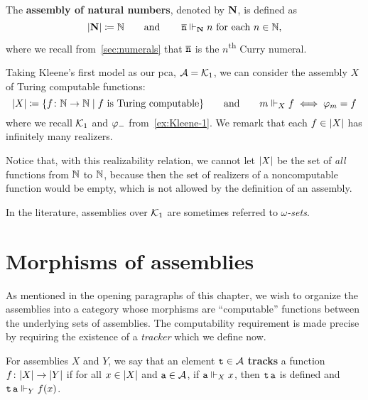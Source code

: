 \begin{example}\label{ex:NatAsm}
  The \textbf{assembly of natural numbers}, denoted by \(\mathbf N\), is defined as
  \[
    \lvert\mathbf N\rvert \coloneqq \mathbb N
    \quad\quad\text{and}\quad\quad
    \operatorname{\overline{\mathtt{n}}} \Vdash_\mathbf N n \text{ for each \(n \in \mathbb N\)},
  \]
  where we recall from~\cref{sec:numerals} that \(\operatorname{\overline{\mathtt{n}}}\) is the
  \(n\)\textsuperscript{th} Curry numeral.
\end{example}

\begin{example}
  Taking Kleene's first model as our pca, \(\mathcal A = \mathcal{K}_1\), we can consider the
  assembly \(X\) of Turing computable functions:
  \[
    \lvert X\rvert \coloneqq \{f \colon \mathbb N \to \mathbb N \mid f \text{ is Turing computable}\}
    \quad\quad\text{and}\quad\quad
    m \Vdash_X f \iff \varphi_{m} = f
  \]
  where we recall \(\mathcal{K}_1\) and \(\varphi_{-}\) from~\cref{ex:Kleene-1}.
  We remark that each \(f \in \lvert X\rvert\) has infinitely many realizers.

  Notice that, with this realizability relation, we cannot let \(\lvert X\rvert\)
  be the set of \emph{all} functions from \(\mathbb N\) to \(\mathbb N\), because then the
  set of realizers of a noncomputable function would be empty, which is not
  allowed by the definition of an assembly.
\end{example}

In the literature, assemblies over \(\mathcal{K}_1\) are sometimes referred
to \emph{\(\omega\)-sets}.

\section{Morphisms of assemblies}

As mentioned in the opening paragraphs of this chapter, we wish to organize the
assemblies into a category whose morphisms are ``computable'' functions between
the underlying sets of assemblies.
%
The computability requirement is made precise by requiring the existence of a
\emph{tracker} which we define now.

\begin{definition}[Track]
  For assemblies \(X\) and \(Y\), we say that an element \(\operatorname{\mathtt{t}} \in \mathcal A\)
  \textbf{tracks} a function \(f \colon \lvert X\rvert \to \lvert Y\rvert\) if for all
  \(x \in \lvert X\rvert\) and \(\operatorname{\mathtt{a}} \in \mathcal A\), if \(\operatorname{\mathtt{a}} \Vdash_X x\), then
  \(\operatorname{\mathtt{t}}\operatorname{\mathtt{a}}\) is defined and \(\operatorname{\mathtt{t}}\operatorname{\mathtt{a}} \Vdash_Y f(x)\).
\end{definition}

